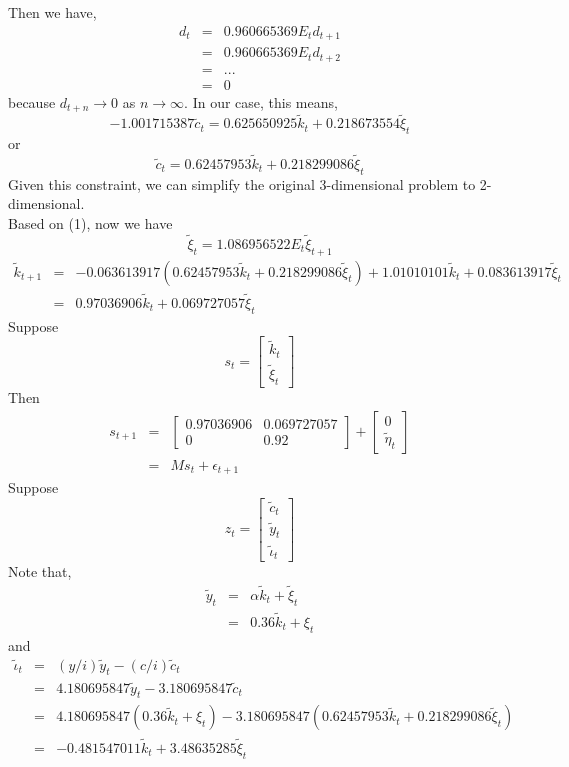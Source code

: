 \documentclass{article}
\begin{document}
Then we have,
\begin{eqnarray*}
    d_t & = & 0.960665369E_t d_{t+1} \\
    & = & 0.960665369E_t d_{t+2} \\
    & = & ... \\
    & = & 0
\end{eqnarray*}
because $d_{t+n} \longrightarrow 0$ as $n \longrightarrow \infty$. In our case, this means,
$$-1.001715387\tilde c_t= 0.625650925\tilde k_t + 0.218673554\tilde \xi_t$$
or
$$\tilde c_t= 0.62457953\tilde k_t + 0.218299086\tilde \xi_t$$
Given this constraint, we can simplify the original 3-dimensional problem to 2-dimensional. \\
Based on (1), now we have
$$\tilde \xi_{t}=1.086956522E_t\tilde \xi_{t+1}$$
\begin{eqnarray*}
    \tilde k_{t+1} & = & -0.063613917(0.62457953\tilde k_t + 0.218299086\tilde \xi_t) + 1.01010101\tilde k_t + 0.083613917\tilde \xi_t \\
    & = & 0.97036906\tilde k_t + 0.069727057\tilde \xi_t
\end{eqnarray*}
Suppose
$$s_t= \left[\begin{array}{c} \tilde k_{t} \\ \tilde \xi_{t} \end{array}\right] $$
Then
\begin{eqnarray*}
s_{t+1} & = & \left[\begin{array}{cc} 0.97036906 & 0.069727057 \\ 0 & 0.92 \end{array}\right] + \left[\begin{array}{c} 0 \\ \tilde \eta_{t} \end{array}\right] \\ & = & Ms_t+\epsilon_{t+1}
\end{eqnarray*}
Suppose
$$z_t= \left[\begin{array}{c} \tilde c_{t} \\ \tilde y_{t} \\ \tilde \iota_{t} \end{array}\right] $$
Note that,
\begin{eqnarray*}
    \tilde y_{t} & = & \alpha \tilde k_{t} + \tilde \xi_{t} \\
    & = & 0.36 \tilde k_t + \xi_t
\end{eqnarray*}
and
\begin{eqnarray*}
    \tilde \iota_{t} & = & (y/i)\tilde y_{t}-(c/i)\tilde c_{t} \\
    & = & 4.180695847\tilde y_{t} -3.180695847\tilde c_{t} \\
    & = & 4.180695847(0.36 \tilde k_t + \xi_t)-3.180695847(0.62457953\tilde k_t + 0.218299086\tilde \xi_t) \\
    & = & -0.481547011 \tilde k_t + 3.48635285 \tilde \xi_t
\end{eqnarray*}
\end{document}
